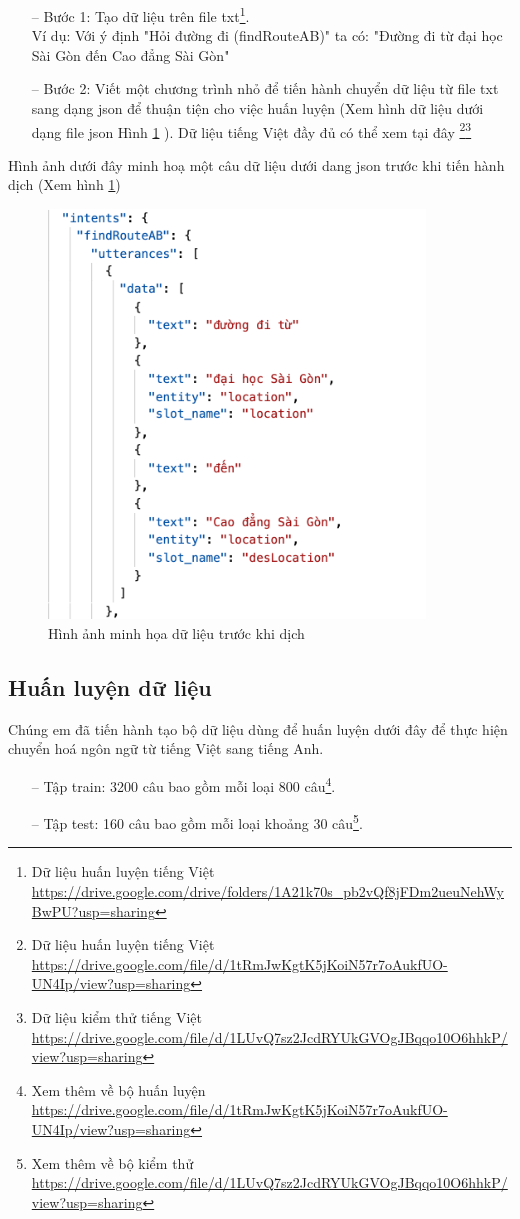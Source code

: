 \begin{itemize}
    \item[--] Bước 1: Tạo dữ liệu trên file txt\footnote{Dữ liệu huấn luyện tiếng Việt \url{https://drive.google.com/drive/folders/1A21k70s_pb2vQf8jFDm2ueuNehWyBwPU?usp=sharing}}. 
    \\Ví dụ: Với ý định "Hỏi đường đi (findRouteAB)" ta có: "Đường đi từ đại học Sài Gòn đến Cao đẳng Sài Gòn"
    \item[--] Bước 2: Viết một chương trình nhỏ để tiến hành chuyển dữ liệu từ file txt sang dạng json để thuận tiện cho việc huấn luyện (Xem hình dữ liệu dưới dạng file json Hình \ref{fig:data-train-json} ). Dữ liệu tiếng Việt đầy đủ có thể xem tại đây \footnote{Dữ liệu huấn luyện tiếng Việt \url{https://drive.google.com/file/d/1tRmJwKgtK5jKoiN57r7oAukfUO-UN4Ip/view?usp=sharing}}\footnote{Dữ liệu kiểm thử tiếng Việt \url{https://drive.google.com/file/d/1LUvQ7sz2JcdRYUkGVOgJBqqo10O6hhkP/view?usp=sharing}}
\end{itemize}
Hình ảnh dưới đây minh hoạ một câu dữ liệu dưới dang json trước khi tiến hành dịch (Xem hình \ref{fig:data-train-json})
\begin{figure}[H]
    \centering
    \includegraphics[width=10cm]{images/Data-train-json.png}
    \caption{Hình ảnh minh họa dữ liệu trước khi dịch}
    \label{fig:data-train-json}
\end{figure}
\subsection{Huấn luyện dữ liệu}
Chúng em đã tiến hành tạo bộ dữ liệu dùng để huấn luyện dưới đây để thực hiện chuyển hoá ngôn ngữ từ tiếng Việt sang tiếng Anh.
\begin{itemize}
    \item[--] Tập train: 3200 câu bao gồm mỗi loại 800 câu\footnote{Xem thêm về bộ huấn luyện \url{https://drive.google.com/file/d/1tRmJwKgtK5jKoiN57r7oAukfUO-UN4Ip/view?usp=sharing}}.
    \item[--] Tập test: 160 câu bao gồm mỗi loại khoảng 30 câu\footnote{Xem thêm về bộ kiểm thử \url{https://drive.google.com/file/d/1LUvQ7sz2JcdRYUkGVOgJBqqo10O6hhkP/view?usp=sharing}}.
\end{itemize}


